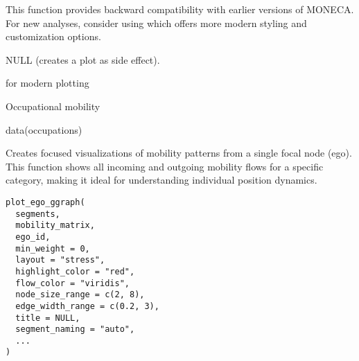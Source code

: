 \documentclass[a4paper]{book}
\begin{document}
%
\begin{Details}
This function provides backward compatibility with earlier versions of MONECA.
For new analyses, consider using  which offers
more modern styling and customization options.
\end{Details}
%
\begin{Value}
NULL (creates a plot as side effect).
\end{Value}
%
\begin{SeeAlso}
 for modern plotting
\end{SeeAlso}
%
\begin{Description}
Occupational mobility
\end{Description}
%
\begin{Examples}
\begin{ExampleCode}
data(occupations)


\end{ExampleCode}
\end{Examples}
%
\begin{Description}
Creates focused visualizations of mobility patterns from a single focal node
(ego). This function shows all incoming and outgoing mobility flows for a
specific category, making it ideal for understanding individual position dynamics.
\end{Description}
%
\begin{Usage}
\begin{verbatim}
plot_ego_ggraph(
  segments,
  mobility_matrix,
  ego_id,
  min_weight = 0,
  layout = "stress",
  highlight_color = "red",
  flow_color = "viridis",
  node_size_range = c(2, 8),
  edge_width_range = c(0.2, 3),
  title = NULL,
  segment_naming = "auto",
  ...
)
\end{verbatim}
\end{Usage}
%
\end{document}
